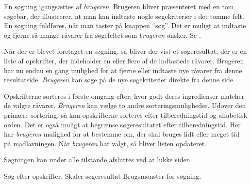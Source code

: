 {En søgning igangsættes af \textit{brugeren}. Brugeren bliver præsenteret med en tom søgebar, der illustrerer, at man kan indtaste nogle søgekriterier i det tomme felt. En søgning fuldføres, når man taster på knappen ``søg''. Det er muligt at indtaste og fjerne så mange råvarer fra søgefeltet som \textit{brugeren} ønsker. Se .

Når der er blevet foretaget en søgning, så bliver der vist et søgeresultat, der er en liste af opskrifter, der indeholder en eller flere af de indtastede råvarer. Brugeren har nu endnu en gang mulighed for at fjerne eller indtaste nye råvarer fra denne resultatside. \textit{Brugeren} kan søge på de nye søgekriterier direkte fra denne side.

Opskrifterne sorteres i første omgang efter, hvor godt deres ingredienser matcher de valgte råvarer. \textit{Brugeren} kan vælge to andre sorteringsmuligheder. Udover den primære sortering, så kan opskrifterne sorteres efter tilberedningstid og alfabetisk orden. Det er også muligt at begrænse søgeresultatet efter tilberedningstid. Her har \textit{brugeren} mulighed for at bestemme om, der skal bruges lidt eller meget tid på madlavningen. Når \textit{brugeren} har valgt, så bliver listen opdateret.

Søgningen kan under alle tilstande afsluttes ved at lukke siden.}
{}
{Søg efter opskrifter, Skaler søgeresultat}
{Brugsmønster for søgning.}
